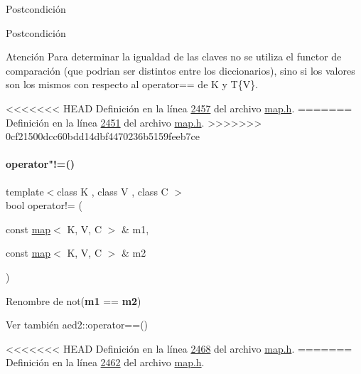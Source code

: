 \begin{DoxyPostcond}{\-Postcondición}
\begin{DoxyPostcond}{\-Postcondición}
\begin{DoxyAttention}{Atención}
Para determinar la igualdad de las claves no se utiliza el functor de comparación (que podrian ser distintos entre los diccionarios), sino si los valores son los mismos con respecto al operator== de K y T\{V\}. 
\end{DoxyAttention}


<<<<<<< HEAD
\-Definición en la línea \hyperlink{map_8h_source_l02457}{2457} del archivo \hyperlink{map_8h_source}{map.\-h}.
=======
Definición en la línea \hyperlink{map_8h_source_l02451}{2451} del archivo \hyperlink{map_8h_source}{map.\+h}.
>>>>>>> 0cf21500dcc60bdd14dbf4470236b5159feeb7ce

\mbox{\label{classaed2_1_1map_abce0fa35c5b25fd67111c2e704616f09_abce0fa35c5b25fd67111c2e704616f09}} 
\paragraph{\texorpdfstring{operator"!=()}{operator!=()}}
{\footnotesize\ttfamily template$<$class K , class V , class C $>$ \\
bool operator!= (\begin{DoxyParamCaption}\item[{const \hyperlink{classaed2_1_1map}{map}$<$ K, V, C $>$ \&}]{m1,  }\item[{const \hyperlink{classaed2_1_1map}{map}$<$ K, V, C $>$ \&}]{m2 }\end{DoxyParamCaption})\hspace{0.3cm}{\ttfamily [related]}}



Renombre de not({\bfseries m1} == {\bfseries m2}) 

\begin{DoxySeeAlso}{Ver también}
aed2\+::operator==() 
\end{DoxySeeAlso}


<<<<<<< HEAD
\-Definición en la línea \hyperlink{map_8h_source_l02468}{2468} del archivo \hyperlink{map_8h_source}{map.\-h}.
=======
Definición en la línea \hyperlink{map_8h_source_l02462}{2462} del archivo \hyperlink{map_8h_source}{map.\+h}.

\mbox{\label{classaed2_1_1map_a8ff07f6a24c290ea7e8f63ec7ab24f8d_a8ff07f6a24c290ea7e8f63ec7ab24f8d}} 

\end{DoxyPostcond}
\end{DoxyPostcond}
